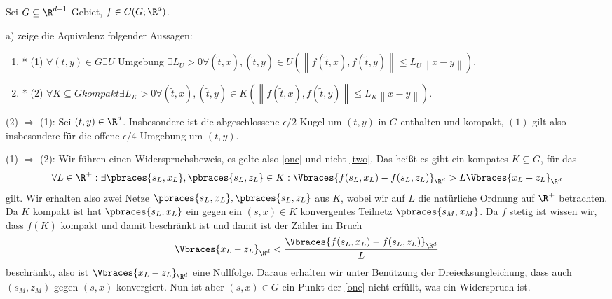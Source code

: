 \begin{exercise}

Sei $G \subseteq \R^{d+1}$ Gebiet, $f \in C(G; \R^d)$.

a) zeige die Äquivalenz folgender Aussagen:

\begin{enumerate}
  \item* (1) $\forall (t, y) \in G \exists U$ Umgebung $\exists L_U > 0 \forall (\tilde{t}, x), (\tilde{t}, y) \in U
  (\left\lVert f(\tilde{t}, x), f(\tilde{t}, y) \right\rVert \leq L_U \left\lVert x-y \right\rVert).$ \label{one}
  \item* (2) $\forall K \subseteq G kompakt \exists L_K > 0 \forall (\tilde{t}, x), (\tilde{t}, y) \in K
  (\left\lVert f(\tilde{t}, x), f(\tilde{t}, y) \right\rVert \leq L_K \left\lVert x-y \right\rVert).$ \label{two}
\end{enumerate}

\end{exercise}

\begin{solution}

(2) $\Rightarrow$ (1):
Sei $(t, y) \in \R^d$.
Insbesondere ist die abgeschlossene $\epsilon /2$-Kugel um $(t,y)$ in $G$ enthalten und kompakt, $(1)$ gilt also insbesondere für die offene $\epsilon /4$-Umgebung um $(t,y)$.

(1) $\Rightarrow$ (2):
Wir führen einen Widerspruchsbeweis, es gelte also \eqref{one} und nicht \eqref{two}. Das heißt es gibt ein kompates $K \subseteq G$, für das 
  \begin{align*}
    \forall L \in \R^+: \exists \pbraces{s_L,x_L}, \pbraces{s_L, z_L} \in K: \Vbraces{f(s_L,x_L) - f(s_L,z_L)}_{\R^d} > L \Vbraces{x_L - z_L}_{\R^d}
  \end{align*}
gilt. Wir erhalten also zwei Netze $\pbraces{s_L,x_L}, \pbraces{s_L, z_L}$ aus $K$, wobei wir auf $L$ die natürliche Ordnung auf $\R^+$ betrachten. Da $K$ kompakt ist hat $\pbraces{s_L,x_L}$ ein gegen ein $(s,x) \in K$ konvergentes Teilnetz $\pbraces{s_M, x_M}$. Da $f$ stetig ist wissen wir, dass $f(K)$ kompakt und damit beschränkt ist und damit ist der Zähler im Bruch
  \begin{align*}
    \Vbraces{x_L - z_L}_{\R^d} < \frac{\Vbraces{f(s_L,x_L) - f(s_L,z_L)}_{\R^d}}{L}
  \end{align*}
  beschränkt, also ist $\Vbraces{x_L - z_L}_{\R^d}$ eine Nullfolge. Daraus erhalten wir unter Benützung der Dreiecksungleichung, dass auch $(s_M,z_M)$ gegen $(s,x)$ konvergiert. Nun ist aber $(s,x) \in G$ ein Punkt der \eqref{one} nicht erfüllt, was ein Widerspruch ist.
\end{solution}
